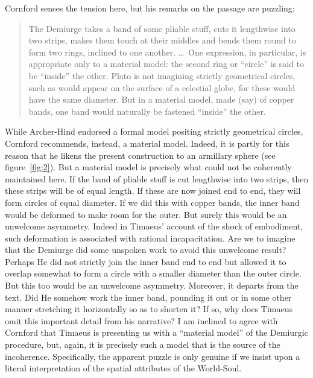 Cornford senses the tension here, but his remarks on the passage are puzzling:
\begin{quote}
	The Demiurge takes a band of some pliable stuff, cuts it lengthwise into two strips, makes them touch at their middles and bends them round to form two rings, inclined to one another. \ldots\ One expression, in particular, is appropriate only to a material model: the second ring or ``circle'' is said to be ``inside'' the other. Plato is not imagining strictly geometrical circles, such as would appear on the surface of a celestial globe, for these would have the same diameter. But in a material model, made (say) of copper bands, one band would naturally be fastened ``inside'' the other. \citep[74]{Cornford:1935fk}
\end{quote}
While Archer-Hind endorsed a formal model positing strictly geometrical circles, Cornford recommends, instead, a material model. Indeed, it is partly for this reason that he likens the present construction to an armillary sphere (see figure~\ref{fig:2}). But a material model is precisely what could not be coherently maintained here. If the band of pliable stuff is cut lengthwise into two strips, then these strips will be of equal length. If these are now joined end to end, they will form circles of equal diameter. If we did this with copper bands, the inner band would be deformed to make room for the outer. But surely this would be an unwelcome asymmetry. Indeed in Timaeus' account of the shock of embodiment, such deformation is associated with rational incapacitation. Are we to imagine that the Demiurge did some unspoken work to avoid this unwelcome result? Perhaps He did not strictly join the inner band end to end but allowed it to overlap somewhat to form a circle with a smaller diameter than the outer circle. But this too would be an unwelcome asymmetry. Moreover, it departs from the text. Did He somehow work the inner band, pounding it out or in some other manner stretching it horizontally so as to shorten it? If so, why does Timaeus omit this important detail from his narrative? I am inclined to agree with Cornford that Timaeus is presenting us with a ``material model'' of the Demiurgic procedure, but, again, it is precisely such a model that is the source of the incoherence. Specifically, the apparent puzzle is only genuine if we insist upon a literal interpretation of the spatial attributes of the World-Soul.

